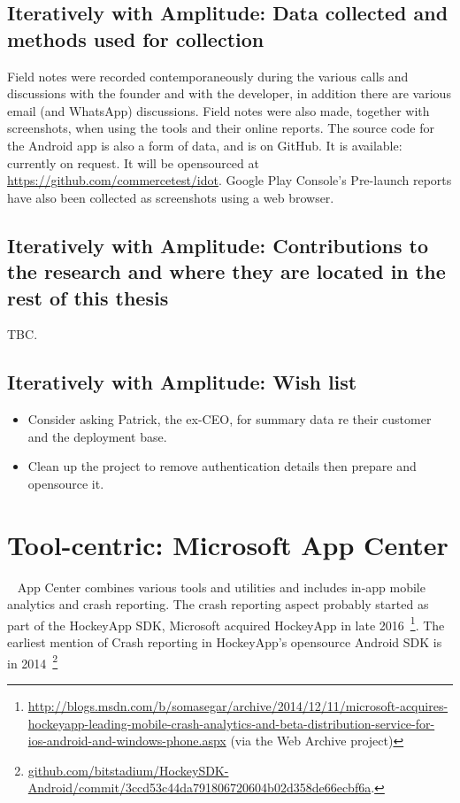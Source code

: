 \subsection{Iteratively with Amplitude: Data collected and methods used for collection}
Field notes were recorded contemporaneously during the various calls and discussions with the founder and with the developer, in addition there are various email (and WhatsApp) discussions. Field notes were also made, together with screenshots, when using the tools and their online reports. The source code for the Android app is also a form of data, and is on GitHub. It is available: currently on request. It will be opensourced at \url{https://github.com/commercetest/idot}. Google Play Console's Pre-launch reports have also been collected as screenshots using a web browser.

\subsection{Iteratively with Amplitude: Contributions to the research and where they are located in the rest of this thesis}
TBC.

\subsection*{Iteratively with Amplitude: Wish list}
{\small
\begin{itemize}
    \item Consider asking Patrick, the ex-CEO, for summary data re their customer and the deployment base. 
    \item Clean up the project to remove authentication details then prepare and opensource it.
\end{itemize}
}

\clearpage


\section{Tool-centric: Microsoft App Center}~\label{case-study-overview-microsoft-app-center}
App Center combines various tools and utilities and includes in-app mobile analytics and crash reporting. The crash reporting aspect probably started as part of the HockeyApp SDK, Microsoft acquired HockeyApp in late 2016~\footnote{\href{https://web.archive.org/web/20150702124106/http://blogs.msdn.com/b/somasegar/archive/2014/12/11/microsoft-acquires-hockeyapp-leading-mobile-crash-analytics-and-beta-distribution-service-for-ios-android-and-windows-phone.aspx}{http://blogs.msdn.com/b/somasegar/archive/2014/12/11/microsoft-acquires-hockeyapp-leading-mobile-crash-analytics-and-beta-distribution-service-for-ios-android-and-windows-phone.aspx} (via the Web Archive project)}. The earliest mention of Crash reporting in HockeyApp's opensource Android SDK is in 2014~\footnote{\href{https://github.com/bitstadium/HockeySDK-Android/commit/3ccd53c44da791806720604b02d358de66ecbf6a}{github.com/bitstadium/HockeySDK-Android/commit/3ccd53c44da791806720604b02d358de66ecbf6a}.}

